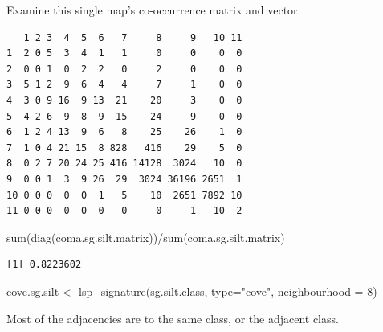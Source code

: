 \documentclass[
  letterpaper,
  DIV=11,
  numbers=noendperiod]{scrartcl}
\newenvironment{Shaded}{\begin{snugshade}}{\end{snugshade}}
\newcommand{\AttributeTok}[1]{\textcolor[rgb]{0.40,0.45,0.13}{#1}}
\newcommand{\CommentTok}[1]{\textcolor[rgb]{0.37,0.37,0.37}{#1}}
\newcommand{\DecValTok}[1]{\textcolor[rgb]{0.68,0.00,0.00}{#1}}
\newcommand{\FunctionTok}[1]{\textcolor[rgb]{0.28,0.35,0.67}{#1}}
\newcommand{\NormalTok}[1]{\textcolor[rgb]{0.00,0.23,0.31}{#1}}
\newcommand{\OtherTok}[1]{\textcolor[rgb]{0.00,0.23,0.31}{#1}}
\newcommand{\SpecialCharTok}[1]{\textcolor[rgb]{0.37,0.37,0.37}{#1}}
\newcommand{\StringTok}[1]{\textcolor[rgb]{0.13,0.47,0.30}{#1}}
\begin{document}
Examine this single map's co-occurrence matrix and vector:

\begin{Shaded}
\end{Shaded}

\begin{verbatim}
   1 2 3  4  5  6   7     8     9   10 11
1  2 0 5  3  4  1   1     0     0    0  0
2  0 0 1  0  2  2   0     2     0    0  0
3  5 1 2  9  6  4   4     7     1    0  0
4  3 0 9 16  9 13  21    20     3    0  0
5  4 2 6  9  8  9  15    24     9    0  0
6  1 2 4 13  9  6   8    25    26    1  0
7  1 0 4 21 15  8 828   416    29    5  0
8  0 2 7 20 24 25 416 14128  3024   10  0
9  0 0 1  3  9 26  29  3024 36196 2651  1
10 0 0 0  0  0  1   5    10  2651 7892 10
11 0 0 0  0  0  0   0     0     1   10  2
\end{verbatim}

\begin{Shaded}
\begin{Highlighting}[]
\FunctionTok{sum}\NormalTok{(}\FunctionTok{diag}\NormalTok{(coma.sg.silt.matrix))}\SpecialCharTok{/}\FunctionTok{sum}\NormalTok{(coma.sg.silt.matrix)}
\end{Highlighting}
\end{Shaded}

\begin{verbatim}
[1] 0.8223602
\end{verbatim}

\begin{Shaded}
\begin{Highlighting}[]
\NormalTok{cove.sg.silt }\OtherTok{\textless{}{-}} \FunctionTok{lsp\_signature}\NormalTok{(sg.silt.class, }\AttributeTok{type=}\StringTok{"cove"}\NormalTok{, }\AttributeTok{neighbourhood =} \DecValTok{8}\NormalTok{)}
\end{Highlighting}
\end{Shaded}

Most of the adjacencies are to the same class, or the adjacent class.
\end{document}
